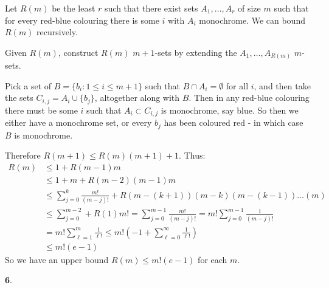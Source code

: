 \documentclass[]{article}
\theoremstyle{custhm}
\theoremstyle{cusdef}
\theoremstyle{custhm}
\theoremstyle{custhm}
\theoremstyle{custhm}
\theoremstyle{custhm}
\theoremstyle{cusdef}
\theoremstyle{remark}
\begin{document}
Let $R(m)$ be the least $r$ such that there exist sets $A_1,\dots,A_r$ of size $m$ such that for every red-blue colouring there is some $i$ with $A_i$ monochrome. We can bound $R(m)$ recursively.

Given $R(m)$, construct $R(m)$ $m+1$-sets by extending the $A_1,\dots,A_{R(m)}$ $m$-sets.

Pick a set of $B = \{b_i:1\le i\le m+1\}$ such that $B\cap A_i = \emptyset$ for all $i$, and then take the sets $C_{i,j} = A_i\cup\{b_j\}$, altogether along with $B$. Then in any red-blue colouring there must be some $i$ such that $A_i\subset C_{i,j}$ is monochrome, say blue. So then we either have a monochrome set, or every $b_j$ has been coloured red - in which case $B$ is monochrome.

Therefore $R(m+1)\le R(m)(m+1)+1$. Thus:
\begin{align*}
R(m) &\le 1 + R(m-1)m\\
&\le 1 + m + R(m-2)(m-1)m\\
&\le \sum_{j=0}^{k}\frac{m!}{(m-j)!}+R(m-(k+1))(m-k)(m-(k-1))\dots(m)\\
&\le \sum_{j=0}^{m-2} + R(1)m!= \sum_{j=0}^{m-1}\frac{m!}{(m-j)!} =m!\sum_{j = 0}^{m-1}\frac{1}{(m-j)!}\\
&=m!\sum_{\ell = 1}^{m}\frac{1}{\ell!} \le m!(-1 + \sum_{\ell = 0}^{\infty}\frac{1}{\ell!})\\
&\le m!(e-1)
\end{align*}
So we have an upper bound $R(m)\le m!(e-1)$ for each $m$.

\textbf{6}.
\end{document}
